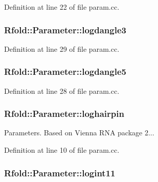 Definition at line 22 of file param.\+cc.

\hypertarget{namespace_rfold_1_1_parameter_a7ebf93e2b64043655dfd704b20027f66}{
\subsubsection[{logdangle3}]{ Rfold\+::\+Parameter\+::logdangle3}}\label{namespace_rfold_1_1_parameter_a7ebf93e2b64043655dfd704b20027f66}


Definition at line 29 of file param.\+cc.

\hypertarget{namespace_rfold_1_1_parameter_abc3f765f6034c3b0d649c4aa7260a57a}{
\subsubsection[{logdangle5}]{ Rfold\+::\+Parameter\+::logdangle5}}\label{namespace_rfold_1_1_parameter_abc3f765f6034c3b0d649c4aa7260a57a}


Definition at line 28 of file param.\+cc.

\hypertarget{namespace_rfold_1_1_parameter_a77b3fdd09fce9d33d5a82dc3010e0f2f}{
\subsubsection[{loghairpin}]{ Rfold\+::\+Parameter\+::loghairpin}}\label{namespace_rfold_1_1_parameter_a77b3fdd09fce9d33d5a82dc3010e0f2f}
Parameters. Based on Vienna R\+N\+A package 2... 

Definition at line 10 of file param.\+cc.

\hypertarget{namespace_rfold_1_1_parameter_a2404b0a6afb266f9a5f3646494460626}{
\subsubsection[{logint11}]{ Rfold\+::\+Parameter\+::logint11}}\label{namespace_rfold_1_1_parameter_a2404b0a6afb266f9a5f3646494460626}


